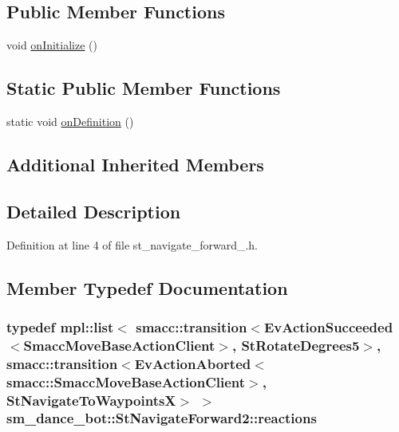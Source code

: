 \subsection*{Public Member Functions}
\begin{DoxyCompactItemize}
\item 
void \hyperlink{structsm__dance__bot_1_1StNavigateForward2_a94ba42076162a9276a6654b057b7c36d}{on\+Initialize} ()
\end{DoxyCompactItemize}
\subsection*{Static Public Member Functions}
\begin{DoxyCompactItemize}
\item 
static void \hyperlink{structsm__dance__bot_1_1StNavigateForward2_acf2394745adca290c9e3a8ff03a8618d}{on\+Definition} ()
\end{DoxyCompactItemize}
\subsection*{Additional Inherited Members}


\subsection{Detailed Description}


Definition at line 4 of file st\+\_\+navigate\+\_\+forward\+\_.\+h.



\subsection{Member Typedef Documentation}
\subsubsection[{\texorpdfstring{reactions}{reactions}}]{\setlength{\rightskip}{0pt plus 5cm}typedef mpl\+::list$<$ {\bf smacc\+::transition}$<$Ev\+Action\+Succeeded$<$Smacc\+Move\+Base\+Action\+Client$>$, {\bf St\+Rotate\+Degrees5}$>$, {\bf smacc\+::transition}$<$Ev\+Action\+Aborted$<${\bf smacc\+::\+Smacc\+Move\+Base\+Action\+Client}$>$, {\bf St\+Navigate\+To\+WaypointsX}$>$ $>$ {\bf sm\+\_\+dance\+\_\+bot\+::\+St\+Navigate\+Forward2\+::reactions}}\hypertarget{structsm__dance__bot_1_1StNavigateForward2_a15e910992cf67be54cd17c67dfd262b5}{}\label{structsm__dance__bot_1_1StNavigateForward2_a15e910992cf67be54cd17c67dfd262b5}


